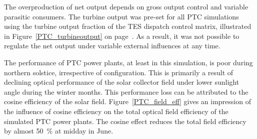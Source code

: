 The overproduction of net output depends on gross output control and variable parasitic consumers. The turbine output was pre-set for all \ac{PTC} simulations using the turbine output fraction of the \ac{TES} dispatch control matrix, illustrated in Figure~\ref{PTC_turbineoutput} on page~\pageref{PTC_turbineoutput}. As a result, it was not possible to regulate the net output under variable external influences at any time.


The performance of \ac{PTC} power plants, at least in this simulation, is poor during northern solstice, irrespective of configuration. This is primarily a result of declining optical performance of the solar collector field under lower sunlight angle during the winter months. This performance loss can be attributed to the cosine efficiency of the solar field. Figure~\ref{PTC_field_eff} gives an impression of the influence of cosine efficiency on the total optical field efficiency of the simulated \ac{PTC} power plants. The cosine effect reduces the total field efficiency by almost \SI{50}{\percent} at midday in June. 


